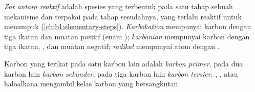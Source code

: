 \begin{definition}\label{def:b1:electronic-effects:intermediates}
\emph{Zat antara reaktif} adalah spesies yang
terbentuk pada satu tahap sebuah mekanisme dan terpakai pada tahap
sesudahnya, yang terlalu reaktif untuk menumpuk
(\cref{ch:b1:elementary-steps}). \emph{Karbokation}
mempunyai karbon dengan tiga ikatan dan muatan positif (enam ); \emph{karbanion} mempunyai karbon dengan tiga
ikatan, , dan muatan negatif;
\emph{radikal} mempunyai atom dengan .
\end{definition}

\begin{definition}\label{def:b1:electronic-effects:carbon-class}
Karbon yang terikat pada satu karbon lain adalah \emph{karbon
primer}, pada dua karbon lain \emph{karbon
sekunder}, pada tiga karbon lain \emph{karbon
tersier}. , , atau haloalkana
mengambil kelas karbon yang bersangkutan.
\end{definition}

